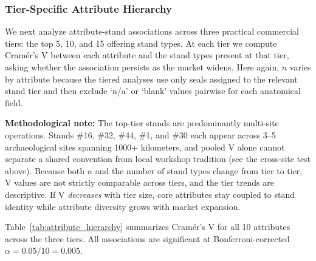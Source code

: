 \documentclass[12pt]{article}
\begin{document}
\subsubsection{Tier-Specific Attribute Hierarchy}

We next analyze attribute-stand associations across three practical commercial
tiers: the top 5, 10, and 15 offering stand types. At each tier we compute
Cram{\'e}r's V between each attribute and the stand types present at that tier,
asking whether the association persists as the market widens. Here again, $n$ varies by attribute
because the tiered analyses use only seals assigned to the relevant stand tier
and then exclude `n/a' or `blank' values pairwise for each anatomical field.

\textbf{Methodological note:} The top-tier stands are predominantly
multi-site operations. Stands \#16, \#32, \#44, \#1, and \#30 each appear
across 3--5 archaeological sites spanning 1000+ kilometers, and pooled V
alone cannot separate a shared convention from local workshop tradition (see the
cross-site test above). Because both $n$ and the number of
stand types change from tier to tier, V values are not strictly comparable across
tiers, and the tier trends are descriptive. If V \emph{decreases} with tier size,
core attributes stay coupled to stand identity while attribute diversity grows with
market expansion.

Table~\ref{tab:attribute_hierarchy} summarizes Cram{\'e}r's V for all 10 attributes
across the three tiers. All associations are significant at Bonferroni-corrected
$\alpha = 0.05/10 = 0.005$.
\end{document}
